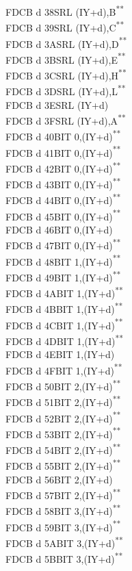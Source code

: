 \documentclass[twoside,openright,a4paper]{book}
\newcommand{\UNDOC}{\textnormal{\textsuperscript{**}}}
\begin{document}
\begin{multicols}{3}
{\begin{tabbing}
	FDCB d 38\>SRL (IY+d),B\UNDOC\\
	FDCB d 39\>SRL (IY+d),C\UNDOC\\
	FDCB d 3A\>SRL (IY+d),D\UNDOC\\
	FDCB d 3B\>SRL (IY+d),E\UNDOC\\
	FDCB d 3C\>SRL (IY+d),H\UNDOC\\
	FDCB d 3D\>SRL (IY+d),L\UNDOC\\
	FDCB d 3E\>SRL (IY+d)\\
	FDCB d 3F\>SRL (IY+d),A\UNDOC\\
	FDCB d 40\>BIT 0,(IY+d)\UNDOC\\
	FDCB d 41\>BIT 0,(IY+d)\UNDOC\\
	FDCB d 42\>BIT 0,(IY+d)\UNDOC\\
	FDCB d 43\>BIT 0,(IY+d)\UNDOC\\
	FDCB d 44\>BIT 0,(IY+d)\UNDOC\\
	FDCB d 45\>BIT 0,(IY+d)\UNDOC\\
	FDCB d 46\>BIT 0,(IY+d)\\
	FDCB d 47\>BIT 0,(IY+d)\UNDOC\\
	FDCB d 48\>BIT 1,(IY+d)\UNDOC\\
	FDCB d 49\>BIT 1,(IY+d)\UNDOC\\
	FDCB d 4A\>BIT 1,(IY+d)\UNDOC\\
	FDCB d 4B\>BIT 1,(IY+d)\UNDOC\\
	FDCB d 4C\>BIT 1,(IY+d)\UNDOC\\
	FDCB d 4D\>BIT 1,(IY+d)\UNDOC\\
	FDCB d 4E\>BIT 1,(IY+d)\\
	FDCB d 4F\>BIT 1,(IY+d)\UNDOC\\
	FDCB d 50\>BIT 2,(IY+d)\UNDOC\\
	FDCB d 51\>BIT 2,(IY+d)\UNDOC\\
	FDCB d 52\>BIT 2,(IY+d)\UNDOC\\
	FDCB d 53\>BIT 2,(IY+d)\UNDOC\\
	FDCB d 54\>BIT 2,(IY+d)\UNDOC\\
	FDCB d 55\>BIT 2,(IY+d)\UNDOC\\
	FDCB d 56\>BIT 2,(IY+d)\\
	FDCB d 57\>BIT 2,(IY+d)\UNDOC\\
	FDCB d 58\>BIT 3,(IY+d)\UNDOC\\
	FDCB d 59\>BIT 3,(IY+d)\UNDOC\\
	FDCB d 5A\>BIT 3,(IY+d)\UNDOC\\
	FDCB d 5B\>BIT 3,(IY+d)\UNDOC\\

\end{tabbing}}
\end{multicols}
\end{document}
